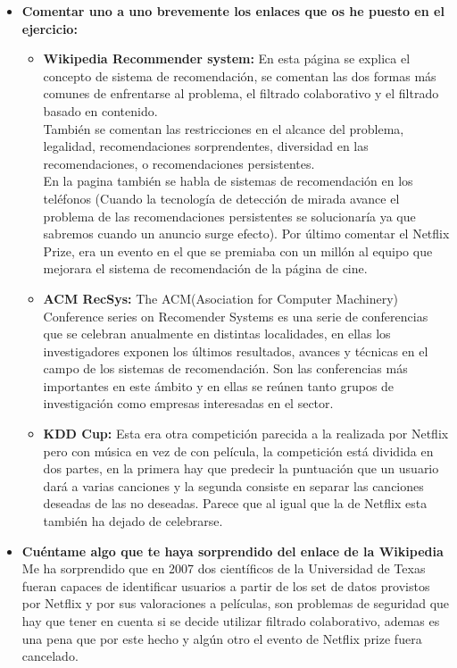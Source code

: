 \documentclass[es]{ifirak}
\begin{document}
\begin{itemize}
	\item \textbf{Comentar uno a uno brevemente los enlaces que os he puesto en el ejercicio:}
		\begin{itemize}
			\item \textbf{Wikipedia Recommender system:} En esta página se explica el concepto de sistema de recomendación, se comentan las dos formas más comunes de enfrentarse al problema, el filtrado colaborativo y el filtrado basado en contenido.\\
			También se comentan las restricciones en el alcance del problema, legalidad, recomendaciones sorprendentes, diversidad en las recomendaciones, o recomendaciones persistentes. \\
			En la pagina también se habla de sistemas de recomendación en los teléfonos (Cuando la tecnología de detección de mirada avance el problema de las recomendaciones persistentes se solucionaría ya que sabremos cuando un anuncio surge efecto).
			Por último comentar el Netflix Prize, era un evento en el que se premiaba con un millón al equipo que mejorara el sistema de recomendación de la página de cine.
			\item \textbf{ACM RecSys:} The ACM(Asociation for Computer Machinery) Conference series on Recomender Systems es una serie de conferencias que se celebran anualmente en distintas localidades, en ellas los investigadores exponen los últimos resultados, avances y técnicas en el campo de los sistemas de recomendación. Son las conferencias más importantes en este ámbito y en ellas se reúnen tanto grupos de investigación como empresas interesadas en el sector.
			\item \textbf{KDD Cup:} Esta era otra competición parecida a la realizada por Netflix pero con música en vez de con película, la competición está dividida en dos partes, en la primera hay que predecir la puntuación que un usuario dará a varias canciones y la segunda consiste en separar las canciones deseadas de las no deseadas. Parece que al igual que la de Netflix esta también ha dejado de celebrarse.
		\end{itemize}

	\item \textbf{Cuéntame algo que te haya sorprendido del enlace de la Wikipedia} \\
	Me ha sorprendido que en 2007 dos científicos de la Universidad de Texas fueran capaces de identificar usuarios a partir de los set de datos provistos por Netflix y por sus valoraciones a películas, son problemas de seguridad que hay que tener en cuenta si se decide utilizar filtrado colaborativo, ademas es una pena que por este hecho y algún otro el evento de Netflix prize fuera cancelado.
	 

\end{itemize}
\end{document}
